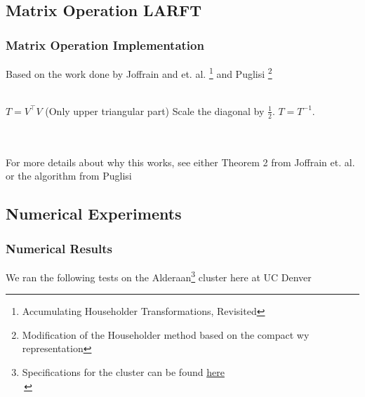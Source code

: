\documentclass[12pt]{beamer}
\begin{document}
    \subsection{Matrix Operation LARFT}
    \begin{frame}
        \frametitle{Matrix Operation Implementation}
        Based on the work done by Joffrain and et. al. \footnote{Accumulating Householder Transformations, Revisited} and Puglisi \footnote{Modification of the Householder method based on the compact wy representation}
        \\\,\\
        \begin{algorithmic}
            \State $T = V^\top V$ (Only upper triangular part)
            \State Scale the diagonal by $\frac{1}{2}$.
            \State $T = T^{-1}$.
        \end{algorithmic}
        \,\\\,\\
        For more details about why this works, see either Theorem 2 from Joffrain et. al. or the algorithm from Puglisi
    \end{frame}
    \subsection{Numerical Experiments}
    \begin{frame}
        \frametitle{Numerical Results}
        We ran the following tests on the Alderaan\footnote{Specifications for the cluster can be found 
        \textcolor{blue}{\href{https://ccm-docs.readthedocs.io/en/latest/alderaan\#hardware}{here}}\\\,} 
        cluster here at UC Denver\\
        \begin{center}
        \end{center}
    \end{frame}
\end{document}
